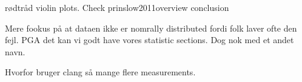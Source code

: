 rødtråd
violin plots.
Check prinslow2011overview conclusion

Mere fookus på at dataen ikke er nomrally distributed fordi folk laver ofte den fejl. PGA det kan vi godt have vores statistic sections. Dog nok med et andet navn. 

Hvorfor bruger clang så mange flere measurements.